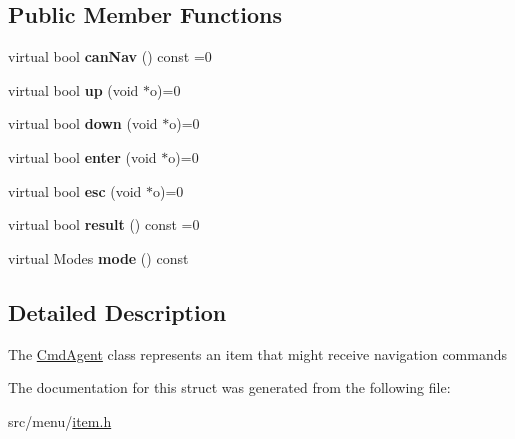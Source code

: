 \subsection*{Public Member Functions}
\begin{DoxyCompactItemize}
\item 
\mbox{\label{structCmdAgent_a1a0eedb14708cc96c254922c545915c5}} 
virtual bool {\bfseries can\+Nav} () const =0
\item 
\mbox{\label{structCmdAgent_a310f823c00f4a7dc427a1d31f6158897}} 
virtual bool {\bfseries up} (void $\ast$o)=0
\item 
\mbox{\label{structCmdAgent_ae95a8096248043644ac58cba80a378b2}} 
virtual bool {\bfseries down} (void $\ast$o)=0
\item 
\mbox{\label{structCmdAgent_a673709ce059dbd54d86c61b0fdc9a17a}} 
virtual bool {\bfseries enter} (void $\ast$o)=0
\item 
\mbox{\label{structCmdAgent_a5fb6b466ecb88ebad13a1e1a1099ef21}} 
virtual bool {\bfseries esc} (void $\ast$o)=0
\item 
\mbox{\label{structCmdAgent_a4836801b65eaf6df12a72ccb8fe0834d}} 
virtual bool {\bfseries result} () const =0
\item 
\mbox{\label{structCmdAgent_a86f5dd66aade20cb1938669ab52a1311}} 
virtual Modes {\bfseries mode} () const
\end{DoxyCompactItemize}


\subsection{Detailed Description}
The \hyperlink{structCmdAgent}{Cmd\+Agent} class represents an item that might receive navigation commands 

The documentation for this struct was generated from the following file\+:\begin{DoxyCompactItemize}
\item 
src/menu/\hyperlink{item_8h}{item.\+h}\end{DoxyCompactItemize}
